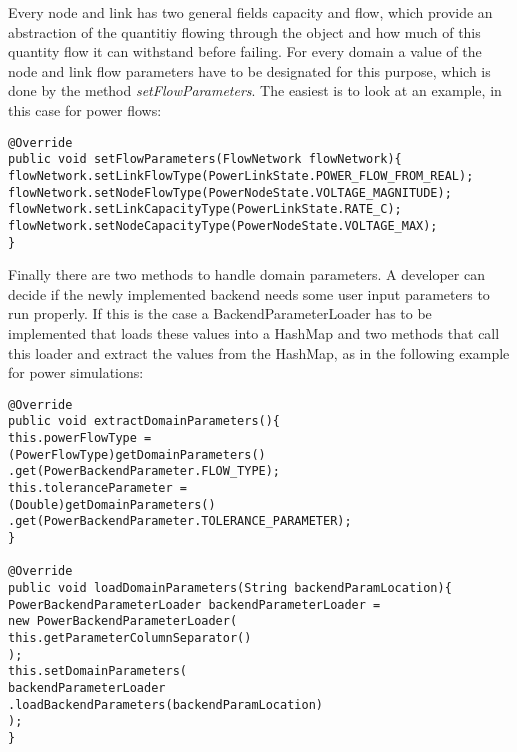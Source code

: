 \documentclass[11pt,fleqn]{book} %
\newcommand{\backend}[1][]{backend#1}
\newcommand{\domain}[1][]{domain#1}
\newcommand{\backendparameters}{domain parameters}
\newcommand{\BackendParameterLoader}{BackendParameterLoader}
\begin{document}
Every node and link has two general fields capacity and flow, which provide an abstraction of the quantitiy flowing through the object and how much of this quantity flow it can withstand before failing. For every \domain{} a value of the node and link flow parameters have to be designated for this purpose, which is done by the method \textit{setFlowParameters}. The easiest is to look at an example, in this case for power flows:
\begin{lstlisting}[frame=single]
@Override
public void setFlowParameters(FlowNetwork flowNetwork){
flowNetwork.setLinkFlowType(PowerLinkState.POWER_FLOW_FROM_REAL);
flowNetwork.setNodeFlowType(PowerNodeState.VOLTAGE_MAGNITUDE);
flowNetwork.setLinkCapacityType(PowerLinkState.RATE_C);
flowNetwork.setNodeCapacityType(PowerNodeState.VOLTAGE_MAX);
}
\end{lstlisting}

Finally there are two methods to handle \backendparameters{}. A developer can decide if the newly implemented \backend{} needs some user input parameters to run properly. If this is the case a \BackendParameterLoader{} has to be implemented that loads these values into a HashMap and two methods that call this loader and extract the values from the HashMap, as in the following example for power simulations:
\begin{lstlisting}[frame=single]
@Override
public void extractDomainParameters(){
this.powerFlowType = 
(PowerFlowType)getDomainParameters()
.get(PowerBackendParameter.FLOW_TYPE);
this.toleranceParameter = 
(Double)getDomainParameters()
.get(PowerBackendParameter.TOLERANCE_PARAMETER);
}

@Override
public void loadDomainParameters(String backendParamLocation){
PowerBackendParameterLoader backendParameterLoader = 
new PowerBackendParameterLoader(
this.getParameterColumnSeparator()
);
this.setDomainParameters(
backendParameterLoader
.loadBackendParameters(backendParamLocation)
);
}
\end{lstlisting}
\end{document}
